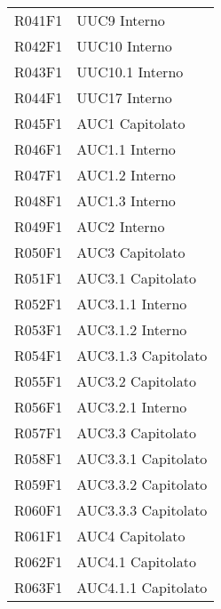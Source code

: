 \documentclass[../analisi-dei-requisiti.tex]{subfiles}
\begin{document}
\begin{longtable}[H]{ p{4cm} | p{4cm} }
  R041F1                               & UUC9 Interno                  \\
  R042F1                               & UUC10 Interno                 \\
  R043F1                               & UUC10.1 Interno               \\
  R044F1                               & UUC17 Interno                 \\
  R045F1                               & AUC1 Capitolato               \\
  R046F1                               & AUC1.1 Interno                \\
  R047F1                               & AUC1.2 Interno                \\
  R048F1                               & AUC1.3 Interno                \\
  R049F1                               & AUC2 Interno                  \\
  R050F1                               & AUC3 Capitolato               \\
  R051F1                               & AUC3.1 Capitolato             \\
  R052F1                               & AUC3.1.1 Interno              \\
  R053F1                               & AUC3.1.2 Interno              \\
  R054F1                               & AUC3.1.3 Capitolato           \\
  R055F1                               & AUC3.2 Capitolato             \\
  R056F1                               & AUC3.2.1 Interno              \\
  R057F1                               & AUC3.3 Capitolato             \\
  R058F1                               & AUC3.3.1 Capitolato           \\
  R059F1                               & AUC3.3.2 Capitolato           \\
  R060F1                               & AUC3.3.3 Capitolato           \\
  R061F1                               & AUC4 Capitolato               \\
  R062F1                               & AUC4.1 Capitolato             \\
  R063F1                               & AUC4.1.1 Capitolato           \\

\end{longtable}
\end{document}

